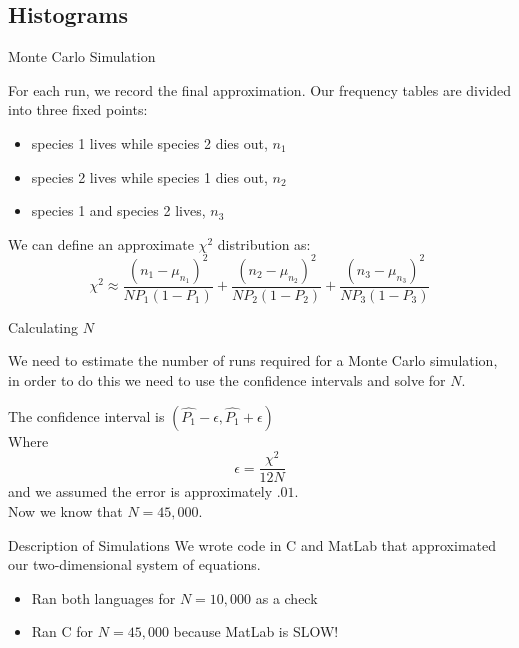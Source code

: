
\subsection{Histograms}

\begin{frame}{Monte Carlo Simulation}
\vfill

For each run, we record the final approximation.
\vfill
Our frequency tables are divided into three fixed points: 

\begin{itemize}
	\item species 1 lives while species 2 dies out, $n_1$
	\item species 2 lives while species 1 dies out, $n_2$
	\item species 1 and species 2 lives, $n_3$
\end{itemize}
\vfill

We can define an approximate $\chi^2$ distribution as:
$$ \chi^2 \approx \frac{\left(n_1 - \mu_{n_1}\right)^2}{N P_1 (1 - P_1)} + 
                  \frac{\left(n_2 - \mu_{n_2}\right)^2}{N P_2 (1 - P_2)} +
									\frac{\left(n_3 - \mu_{n_3}\right)^2}{N P_3 (1 - P_3)}$$
\vfill
\end{frame}

 
\begin{frame}{Calculating $N$}
	
	\vfill
	
	We need to estimate the number of runs required for a Monte Carlo simulation, in order to do this we need to use the confidence intervals and solve for $N$. 
	
	\vfill
	
	The confidence interval is $\left(\hat{P_1} - \epsilon , \hat{P_1} + \epsilon \right)$ \\
	Where $$\epsilon =\frac{\chi^2}{12N}$$ and we assumed the error is approximately $.01.$ \\ 
	Now we know that $N = 45,000.$
		
	\vfill
		
\end{frame}

\begin{frame}{Description of Simulations}
We wrote code in C and MatLab that approximated our two-dimensional system of equations. 
	\begin{itemize}
		\item Ran both languages for $N = 10,000$ as a check
		\item Ran C for $N =45,000$ because MatLab is SLOW!
	\end{itemize}
\end{frame}


